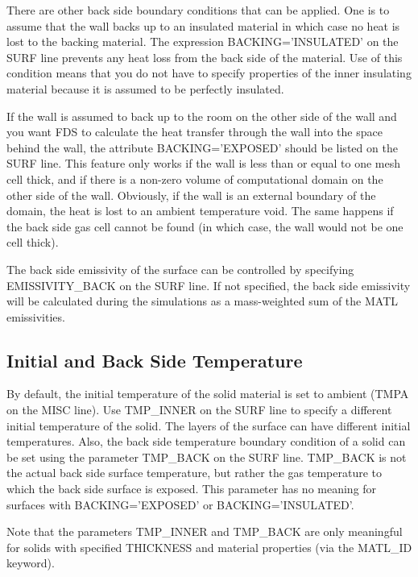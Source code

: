 \documentclass[11pt]{book}
\begin{document}
There are other back side boundary conditions that can be applied. One is to assume that the wall
backs up to an insulated material in which case no heat is lost to
the backing material. The expression {\ct BACKING='INSULATED'} on
the {\ct SURF} line prevents any heat loss from the back side of the material. Use of this condition
means that you  do not have to specify properties of the inner insulating material because it is assumed to
be perfectly insulated.

If the wall is assumed to back up to the room on the other side of
the wall and you want FDS to calculate the heat transfer
through the wall into the space behind the wall, the attribute
{\ct BACKING='EXPOSED'} should be listed on the {\ct SURF} line. This feature only works
if the wall is less than or equal to one mesh cell thick, and if there is a non-zero volume
of computational domain on the other side of the wall. Obviously, if
the wall is an external boundary of the domain, the heat is lost to an ambient temperature void. The same happens if the back side
gas cell cannot be found (in which case, the wall would not be one cell thick).

The back side emissivity of the surface can be controlled by specifying {\ct EMISSIVITY\_BACK} on the {\ct SURF} line. If not specified, the back side
emissivity will be calculated during the simulations as a mass-weighted sum of the {\ct MATL} emissivities.

\subsection{Initial and Back Side Temperature}
\label{info:TMP_INNER}

By default, the initial temperature of the solid material is set to
ambient ({\ct TMPA} on the {\ct MISC} line). Use {\ct TMP\_INNER} on the {\ct SURF} line to
specify a different initial temperature of the solid. The layers of the surface can have different initial temperatures.
Also, the back side temperature boundary condition of a solid can be
set using the parameter {\ct TMP\_BACK} on the {\ct SURF}
line. {\ct TMP\_BACK} is not the actual back side surface temperature,
but rather the gas temperature to which the back side surface is exposed. This
parameter has no meaning for surfaces with {\ct BACKING='EXPOSED'} or
{\ct BACKING='INSULATED'}.


Note that the parameters {\ct TMP\_INNER} and {\ct TMP\_BACK} are only meaningful for solids with specified {\ct THICKNESS} and material
properties (via the {\ct MATL\_ID} keyword).
\end{document}
